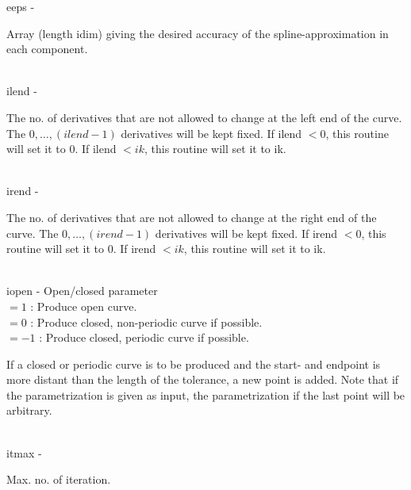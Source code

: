         \>\>    {\fov eeps}\> - \>  \begin{minipg2}
                     Array (length idim) giving the desired accuracy of
                  the spline-approximation in each component.
                               \end{minipg2}\\[0.8ex]
        \>\>    {\fov ilend}\> - \>  \begin{minipg2}
                     The no. of derivatives that are not allowed to change
                 at the left end of the curve.
                 The $0,\ldots,(ilend-1)$ derivatives will be kept fixed.
                 If ilend $<0$, this routine will set it to 0.
                 If ilend $<ik$, this routine will set it to ik.
                               \end{minipg2}\\[0.8ex]
        \>\>    {\fov irend}\> - \>  \begin{minipg2}
                     The no. of derivatives that are not allowed to change
                 at the right end of the curve.
                 The $0,\ldots,(irend-1)$ derivatives will be kept fixed.
                 If irend $<0$, this routine will set it to 0.
                 If irend $<ik$, this routine will set it to ik.
                               \end{minipg2}\\[0.8ex]
        \>\>    {\fov iopen}\> - \>  Open/closed parameter\\
            \>\>\>\>  $= 1$  : Produce open curve.\\
            \>\>\>\>  $= 0$ : Produce closed, non-periodic curve if possible.\\
            \>\>\>\>  $= -1$ : Produce closed, periodic curve if possible.\\
                 \>\>\>\>  \begin{minipg2}
                 If a closed or periodic curve is to be produced and the
                 start- and endpoint is more distant than the length of
                 the tolerance, a new point is added. Note that if the
                 parametrization is given as input, the parametrization
                 if the last point will be arbitrary.
                                \end{minipg2}\\
        \>\>    {\fov itmax}\> - \>  \begin{minipg2}
                     Max. no. of iteration.
                               \end{minipg2}\\
